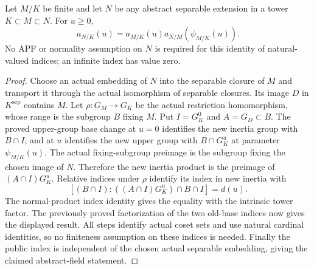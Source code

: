 \begin{lemma}
\label{fw:apf-finite-base-index}
\leanok
Let $M/K$ be finite and let $N$ be any abstract separable extension in
a tower $K\subset M\subset N$. For $u\geq0$,
\[
 a_{N/K}(u)=a_{M/K}(u)a_{N/M}(\psi_{M/K}(u)).
\]
No APF or normality assumption on $N$ is required for this identity of
natural-valued indices; an infinite index has value zero.
\end{lemma}
\begin{proof}
Choose an actual embedding of $N$ into the separable closure of $M$
and transport it through the actual isomorphism of separable closures.
Its image $D$ in $K^{\mathrm{sep}}$ contains $M$.
Let $\rho:G_M\to G_K$ be the actual restriction homomorphism, whose
range is the subgroup $B$ fixing $M$. Put $I=G_K^0$ and
$A=G_D\subset B$. The proved upper-group base change at $u=0$
identifies the new inertia group with $B\cap I$, and at $u$ identifies
the new upper group with $B\cap G_K^u$ at parameter
$\psi_{M/K}(u)$. The actual fixing-subgroup preimage is the subgroup
fixing the chosen image of $N$. Therefore the new inertia product is
the preimage of $(A\cap I)G_K^u$. Relative indices under $\rho$
identify its index in new inertia with
\[
 [(B\cap I):((A\cap I)G_K^u)\cap B\cap I]=d(u).
\]
The normal-product index identity gives the equality with the intrinsic
tower factor. The previously proved factorization of the two old-base
indices now gives the displayed result. All steps identify actual
coset sets and use natural cardinal identities, so no finiteness
assumption on these indices is needed. Finally the public index is
independent of the chosen actual separable embedding, giving the
claimed abstract-field statement.
\end{proof}

